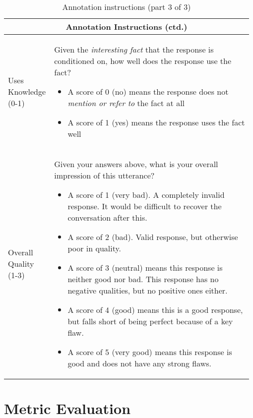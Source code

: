 \documentclass[11pt,a4paper]{article}
\begin{document}
\begin{table*}
    \begin{tabular}{|p{0.18\linewidth}|p{0.8\linewidth}|}
        \hline
        \multicolumn{2}{|c|}{\textbf{Annotation Instructions (ctd.)}} \\ \hline
  
        Uses Knowledge (0-1) &  Given the \textit{interesting fact} that the response is conditioned on, how well does the response use the fact?
        \begin{itemize}
            \item A score of 0 (no) means the response does not \textit{mention or refer to} the fact at all
            \item A score of 1 (yes) means the response uses the fact well     
        \end{itemize} \\ \hline

  
        Overall Quality (1-3) &   Given your answers above, what is your overall impression of this utterance?
        \begin{itemize}
            \item A score of 1 (very bad). A completely invalid response. It would be difficult to recover the conversation after this.
            \item A score of 2 (bad). Valid response, but otherwise poor in quality. 
            \item A score of 3 (neutral) means this response is neither good nor bad. This response has no negative qualities, but no positive ones either.
            \item A score of 4 (good) means this is a good response, but falls short of being perfect because of a key flaw.
            \item A score of 5 (very good) means this response is good and does not have any strong flaws.

        \end{itemize} \\ \hline

    \end{tabular}
    \caption{Annotation instructions (part 3 of 3)}
    
\end{table*}

\section{Metric Evaluation}
\end{document}
